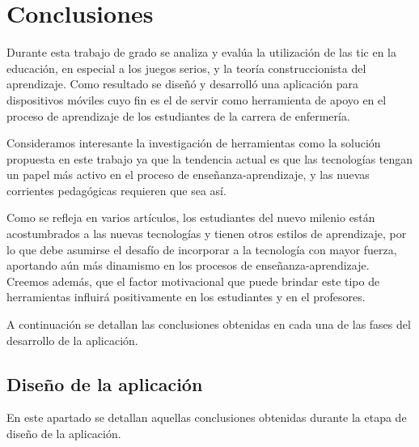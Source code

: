 \section{Conclusiones}

Durante esta trabajo de grado se analiza y evalúa la utilización de las
\Gls{tic} en la educación, en especial a los juegos serios, y la teoría
construccionista del aprendizaje. Como resultado se diseñó y desarrolló una
aplicación para dispositivos móviles cuyo fin es el de servir como herramienta
de apoyo en el proceso de aprendizaje de los estudiantes de la carrera de
enfermería.

Consideramos interesante la investigación de herramientas como la solución
propuesta en este trabajo ya que la tendencia actual es que las tecnologías
tengan un papel más activo en el proceso de enseñanza-aprendizaje, y las nuevas
corrientes pedagógicas requieren que sea así. 

Como se refleja en varios artículos, los estudiantes del nuevo milenio están
acostumbrados a las nuevas tecnologías y tienen otros estilos de aprendizaje,
por lo que debe asumirse el desafío de incorporar a la tecnología con mayor
fuerza, aportando aún más dinamismo en los procesos de enseñanza-aprendizaje.
Creemos además, que el factor motivacional que puede brindar este tipo de
herramientas influirá positivamente en los estudiantes y en el profesores.

A continuación se detallan las conclusiones obtenidas en cada una de las fases
del desarrollo de la aplicación.

\subsection{Diseño de la aplicación}

En este apartado se detallan aquellas conclusiones obtenidas durante la 
etapa de diseño de la aplicación.

